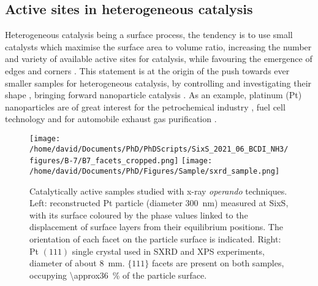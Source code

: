 \subsection{Active sites in heterogeneous catalysis}

Heterogeneous catalysis being a surface process, the tendency is to use small catalysts which maximise the surface area to volume ratio, increasing the number and variety of available active sites for catalysis, while favouring the emergence of edges and corners \parencite{Zambelli1996, Hendriksen2010, Vogt2022}.
This statement is at the origin of the push towards ever smaller samples for heterogeneous catalysis, by controlling and investigating their shape \parencite{Lee2006, Tian2007, Bratlie2007, Lee2009}, bringing forward nanoparticle catalysis \parencite{Che1989, Raimondi2005, Arico2005, Molenbroek2009, VanSanten2010, Schauermann2013}.
As an example, platinum (Pt) nanoparticles are of great interest for the petrochemical industry \parencite{Astruc2005, Astruc2020}, fuel cell technology and for automobile exhaust gas purification \parencite{Heck2001}.

\begin{figure}[!htb]
    \centering
    \texttt{[image: /home/david/Documents/PhD/PhDScripts/SixS\_2021\_06\_BCDI\_NH3/figures/B-7/B7\_facets\_cropped.png]}
    \texttt{[image: /home/david/Documents/PhD/Figures/Sample/sxrd\_sample.png]}
    \caption{
        Catalytically active samples studied with x-ray \textit{operando} techniques.
        Left: reconstructed Pt particle (diameter \qty{300}{\nm}) measured at SixS, with its surface coloured by the phase values linked to the displacement of surface layers from their equilibrium positions.
        The orientation of each facet on the particle surface is indicated.
        Right: Pt $(111)$ single crystal used in SXRD and XPS experiments, diameter of about \qty{8}{\mm}.
        $\{111\}$ facets are present on both samples, occupying \qty{\approx36}{\percent} of the particle surface.
    }
    \label{fig:Samples}
\end{figure}

